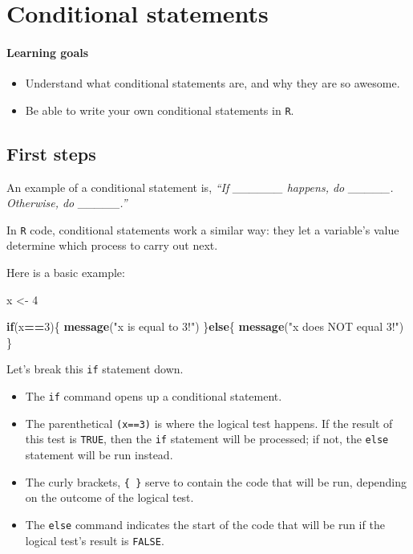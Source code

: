 \documentclass[
]{book}
\newenvironment{Shaded}{\begin{snugshade}}{\end{snugshade}}
\newcommand{\ControlFlowTok}[1]{\textcolor[rgb]{0.13,0.29,0.53}{\textbf{#1}}}
\newcommand{\DecValTok}[1]{\textcolor[rgb]{0.00,0.00,0.81}{#1}}
\newcommand{\KeywordTok}[1]{\textcolor[rgb]{0.13,0.29,0.53}{\textbf{#1}}}
\newcommand{\NormalTok}[1]{#1}
\newcommand{\OperatorTok}[1]{\textcolor[rgb]{0.81,0.36,0.00}{\textbf{#1}}}
\newcommand{\StringTok}[1]{\textcolor[rgb]{0.31,0.60,0.02}{#1}}
\providecommand{\tightlist}{%
  \setlength{\itemsep}{0pt}\setlength{\parskip}{0pt}}
\begin{document}
\hypertarget{conditional-statements}{%
\chapter{Conditional statements}\label{conditional-statements}}

\hypertarget{learning-goals-14}{%
\subsubsection*{Learning goals}\label{learning-goals-14}}

\begin{itemize}
\tightlist
\item
  Understand what conditional statements are, and why they are so awesome.
\item
  Be able to write your own conditional statements in \texttt{R}.
\end{itemize}

\hypertarget{first-steps-1}{%
\section*{First steps}\label{first-steps-1}}

An example of a conditional statement is, \emph{``If \_\_\_\_\_\_ happens, do \_\_\_\_\_. Otherwise, do \_\_\_\_\_.''}

In \texttt{R} code, conditional statements work a similar way: they let a variable's value determine which process to carry out next.

Here is a basic example:

\begin{Shaded}
\begin{Highlighting}[]
\NormalTok{x <-}\StringTok{ }\DecValTok{4}

\ControlFlowTok{if}\NormalTok{(x}\OperatorTok{==}\DecValTok{3}\NormalTok{)\{}
  \KeywordTok{message}\NormalTok{(}\StringTok{"x is equal to 3!"}\NormalTok{)}
\NormalTok{\}}\ControlFlowTok{else}\NormalTok{\{}
  \KeywordTok{message}\NormalTok{(}\StringTok{"x does NOT equal 3!"}\NormalTok{)}
\NormalTok{\}}
\end{Highlighting}
\end{Shaded}

Let's break this \texttt{if} statement down.

\begin{itemize}
\tightlist
\item
  The \texttt{if} command opens up a conditional statement.
\item
  The parenthetical \texttt{(x==3)} is where the logical test happens. If the result of this test is \texttt{TRUE}, then the \texttt{if} statement will be processed; if not, the \texttt{else} statement will be run instead.
\item
  The curly brackets, \texttt{\{\ \}} serve to contain the code that will be run, depending on the outcome of the logical test.
\item
  The \texttt{else} command indicates the start of the code that will be run if the logical test's result is \texttt{FALSE}.
\end{itemize}
\end{document}
